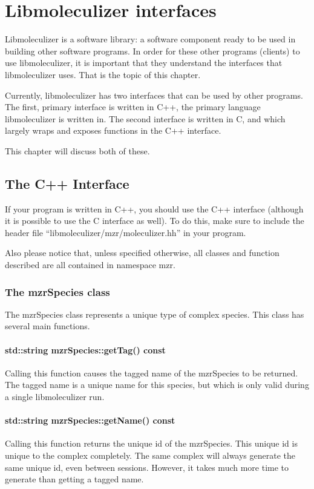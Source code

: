 \chapter{Libmoleculizer interfaces}

Libmoleculizer is a software library: a software component ready to be
used in building other software programs.  In order for these other
programs (clients) to use libmoleculizer, it is important that they understand
the interfaces that libmoleculizer uses.  That is the topic of this
chapter.  

Currently, libmoleculizer has two interfaces that can be used by other
programs.  The first, primary interface is written in C++, the primary
language libmoleculizer is written in.  The second interface is
written in C, and which largely wraps and exposes functions in the C++
interface.  

This chapter will discuss both of these.


\section{The C++ Interface}

If your program is written in C++, you should use the C++ interface
(although it is possible to use the C interface as well).  To do this,
make sure to include the header file
``libmoleculizer/mzr/moleculizer.hh'' in your program.  

Also please notice that, unless specified otherwise, all classes and
function described are all contained in namespace mzr.

\subsection{The mzrSpecies class}
The mzrSpecies class represents a unique type of complex species.
This class has several main functions.

\subsubsection{std::string mzrSpecies::getTag() const }
Calling this function causes the tagged name of the mzrSpecies to be
returned.  The tagged name is a unique name for this species, but
which is only valid during a single libmoleculizer run.  

\subsubsection{std::string mzrSpecies::getName() const }
Calling this function returns the unique id of the mzrSpecies.  This
unique id is unique to the complex completely.  The same complex will
always generate the same unique id, even between sessions.  However,
it takes much more time to generate than getting a tagged name.


